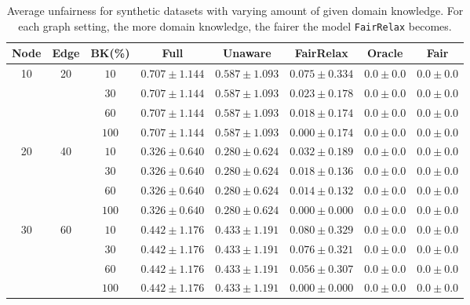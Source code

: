 \documentclass{article}
\begin{document}
\begin{table}[!ht]
\caption{Average unfairness for synthetic datasets with varying amount of given domain knowledge. For each graph setting, the more domain knowledge, the fairer the model \texttt{FairRelax} becomes.}
\label{tab: Fairness performance with varying amount of given domain knowledge}
\begin{center}
\small
\begin{tabular}{cccccccc}
    \hline
           Node  &Edge  &BK(\%)   &Full     &Unaware  &FairRelax  &Oracle   &Fair\\ \hline
  \multirow{4}{*}{10} &\multirow{4}{*}{20} &$10$    &$0.707\pm1.144$ &$0.587\pm1.093$  &$0.075\pm0.334$ &$0.0\pm0.0$ &$0.0\pm0.0$ \\ %
        &    &$30$    &$0.707\pm1.144$ &$0.587\pm1.093$ &$0.023\pm0.178$ &$0.0\pm0.0$ &$0.0\pm0.0$ \\ %
        &    &$60$    &$0.707\pm1.144$ &$0.587\pm1.093$ &$0.018\pm0.174$ &$0.0\pm0.0$ &$0.0\pm0.0$ \\
        &    &$100$   &$0.707\pm1.144$ &$0.587\pm1.093$ &$0.000\pm0.174$ &$0.0\pm0.0$ &$0.0\pm0.0$ \\ \hline\hline
        
  \multirow{4}{*}{20} &\multirow{4}{*}{40} &$10$    &$0.326\pm0.640$ &$0.280\pm0.624$  &$0.032\pm0.189$ &$0.0\pm0.0$ &$0.0\pm0.0$ \\ %
       &     &$30$   &$0.326\pm0.640$ &$0.280\pm0.624$ &$0.018\pm0.136$ &$0.0\pm0.0$ &$0.0\pm0.0$\\ %
       &     &$60$   &$0.326\pm0.640$ &$0.280\pm0.624$ &$0.014\pm0.132$ &$0.0\pm0.0$ &$0.0\pm0.0$\\
       &     &$100$  &$0.326\pm0.640$ &$0.280\pm0.624$ &$0.000\pm0.000$ &$0.0\pm0.0$ &$0.0\pm0.0$\\ \hline\hline
    
  \multirow{4}{*}{30} &\multirow{4}{*}{60}  &$10$    &$0.442\pm1.176$ &$0.433\pm1.191$  &$0.080\pm0.329$ &$0.0\pm0.0$ &$0.0\pm0.0$ \\ %
      &      &$30$   &$0.442\pm1.176$ &$0.433\pm1.191$ &$0.076\pm0.321$ &$0.0\pm0.0$ &$0.0\pm0.0$\\ %
      &     &$60$   &$0.442\pm1.176$ &$0.433\pm1.191$ &$0.056\pm0.307$ &$0.0\pm0.0$ &$0.0\pm0.0$\\
      &     &$100$  &$0.442\pm1.176$ &$0.433\pm1.191$ &$0.000\pm0.000$ &$0.0\pm0.0$ &$0.0\pm0.0$\\ \hline\hline


\end{tabular}
\end{center}
\end{table}
\end{document}
